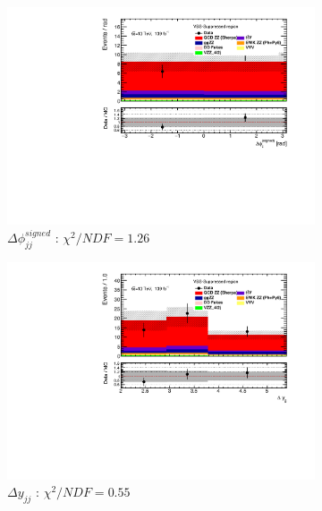 \begin{figure}[!htb]
\begin{subfigure}{.49\textwidth}
        \centering
        \includegraphics[width=.98\linewidth]{figures/Results/RecoDist_VBSSuppressed/reco_dphi_CR.pdf}
        \caption{ \footnotesize{$\Delta \phi _{jj}^{signed}$ }: $\chi^2/NDF = 1.26$ }
    \end{subfigure}
    \begin{subfigure}{.49\textwidth}
        \centering
        \includegraphics[width=.98\linewidth]{figures/Results/RecoDist_VBSSuppressed/reco_dy_CR.pdf}
        \caption{ \footnotesize{$\Delta y_{jj}$ }: $\chi^2/NDF = 0.55$ }
    \end{subfigure}\\
    \begin{subfigure}{.49\textwidth}
        \centering

\end{subfigure}
\end{figure}
